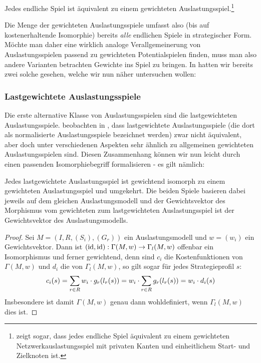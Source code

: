 \begin{satz}\label{satz:JedesSpielGewAusl}
	Jedes endliche Spiel ist äquivalent zu einem gewichteten Auslastungsspiel.\footnote{\citeauthor{ReprOfFiniteGamesAsNCG} zeigt sogar, dass jedes endliche Spiel äquivalent zu einem gewichteten Netzwerkauslastungsspiel mit privaten Kanten und einheitlichem Start- und Zielknoten ist.}
\end{satz}

Die Menge der gewichteten Auslastungsspiele umfasst also (bis auf kostenerhaltende Isomorphie) bereits \emph{alle} endlichen Spiele in strategischer Form. Möchte man daher eine wirklich analoge Verallgemeinerung von Auslastungsspielen passend zu gewichteten Potentialspielen finden, muss man also andere Varianten betrachten Gewichte ins Spiel zu bringen. In  hatten wir bereits zwei solche gesehen, welche wir nun näher untersuchen wollen:

\subsubsection{Lastgewichtete Auslastungsspiele}

Die erste alternative Klasse von Auslastungsspielen sind die lastgewichteten Auslastungsspiele. \citeauthor{CharExGewPotinWCG} beobachten in \cite[S. 53]{CharExGewPotinWCG}, dass lastgewichtete Auslastungsspiele (die dort als normalisierte Auslastungsspiele bezeichnet werden) zwar nicht äquivalent, aber doch unter verschiedenen Aspekten sehr ähnlich zu allgemeinen gewichteten Auslastungsspielen sind. Diesen Zusammenhang können wir nun leicht durch einen passenden Isomorphiebegriff formalisieren - es gilt nämlich:

\begin{lemma}\label{lemma:lastgewAuslIsomGewAusl}
	Jedes lastgewichtete Auslastungsspiel ist gewichtend isomorph zu einem gewichteten Auslastungsspiel und umgekehrt. Die beiden Spiele basieren dabei jeweils auf dem gleichen Auslastungsmodell und der Gewichtsvektor des Morphismus vom gewichteten zum lastgewichteten Auslastungsspiel ist der Gewichtsvektor des Auslastungsmodells.
\end{lemma}

\begin{proof}
	Sei $M = (I, R, (S_i), (G_r))$ ein Auslastungsmodell und $w = (w_i)$ ein Gewichtsvektor. Dann ist $(\mathrm{id}, \mathrm{id}): \Gamma(M, w) \to \Gamma_l(M,w)$ offenbar ein Isomorphismus und ferner gewichtend, denn sind $c_i$ die Kostenfunktionen von $\Gamma(M, w)$ und $d_i$ die von $\Gamma_l(M,w)$, so gilt sogar für jedes Strategieprofil $s$:
		\[c_i(s) = \sum_{r \in R} w_i\cdot g_r(l_r(s)) = w_i \cdot \sum_{r \in R} g_r(l_r(s)) = w_i \cdot d_i(s) \qedhere\]
	Insbesondere ist damit $\Gamma(M, w)$ genau dann wohldefiniert, wenn $\Gamma_l(M, w)$ dies ist.
\end{proof}

